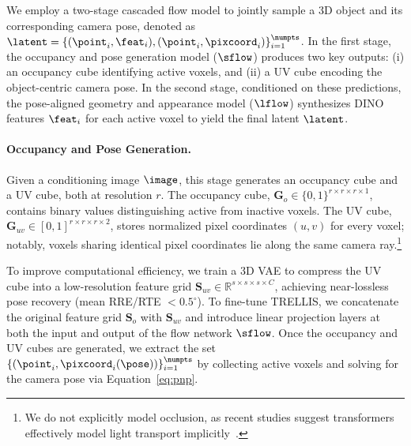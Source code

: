 \documentclass[../../book-main.tex]{subfiles}
\begin{document}
We employ a two-stage cascaded flow model to jointly sample a 3D
object and its corresponding camera pose, denoted as $\latent = \{
(\point_i, \feat_i), (\point_i,\pixcoord_i) \}_{i=1}^{\numpts}$. In
the first stage, the occupancy and pose generation model ($\sflow$)
produces two key outputs: (i) an occupancy cube identifying active
voxels, and (ii) a UV cube encoding the object-centric camera pose.
In the second stage, conditioned on these predictions, the
pose-aligned geometry and appearance model ($\lflow$) synthesizes
DINO~\citep{oquab2023dinov2} features $\feat_i$ for each active voxel
to yield the final latent $\latent$.

\paragraph{Occupancy and Pose Generation.}
Given a conditioning image \(\image\), this stage generates an
occupancy cube and a UV cube, both at resolution $r$. The occupancy
cube, \(\boldsymbol{G}_o \in \{0,1\}^{r \times r \times r \times
1}\), contains binary values distinguishing active from inactive
voxels. The UV cube, \(\boldsymbol{G}_{uv} \in [0,1]^{r \times r
\times r \times 2}\), stores normalized pixel coordinates $(u,v)$ for
every voxel; notably, voxels sharing identical pixel coordinates lie
along the same camera ray.\footnote{We do not explicitly model
occlusion, as recent studies suggest transformers effectively model
light transport implicitly~\citep{jin2024lvsm, zeng2025renderformer}.}

To improve computational efficiency, we train a 3D VAE to compress
the UV cube into a low-resolution feature grid \(\boldsymbol{S}_{uv}
\in \mathbb{R}^{s\times s\times s \times C}\), achieving
near-lossless pose recovery (mean RRE/RTE $< 0.5^\circ$). To
fine-tune TRELLIS, we concatenate the original feature grid
\(\boldsymbol{S}_o\) with \(\boldsymbol{S}_{uv}\) and introduce
linear projection layers at both the input and output of the flow
network $\sflow$. Once the occupancy and UV cubes are generated, we
extract the set $\{ (\point_i, \pixcoord_i(\pose))
\}_{i=1}^{\numpts}$ by collecting active voxels and solving for the
camera pose via Equation~\ref{eq:pnp}.

\end{document}
